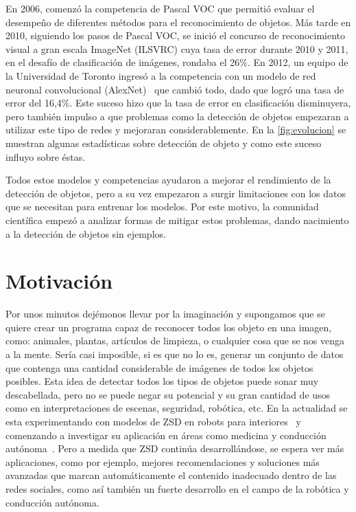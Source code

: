En 2006, comenzó la competencia de Pascal VOC que permitió evaluar el desempeño de diferentes métodos para el reconocimiento de objetos. Más tarde en 2010, siguiendo los pasos de Pascal VOC, se inició el concurso de reconocimiento visual a gran escala ImageNet (ILSVRC) cuya tasa de error durante 2010 y 2011, en el desafío de clasificación de imágenes, rondaba el 26\%.  En 2012, un equipo de la Universidad de Toronto ingresó a la competencia con un modelo de red neuronal convolucional (AlexNet)~\cite{krizhevsky2012imagenet} que cambió todo, dado que logró una tasa de error del 16,4\%. Este suceso hizo que la tasa de error en clasificación disminuyera, pero también impulso a que problemas como la detección de objetos empezaran a utilizar este tipo de redes y mejoraran considerablemente. En la \autoref{fig:evolucion} se muestran algunas estadísticas sobre detección de objeto y como este suceso influyo sobre éstas.

Todos estos modelos y competencias ayudaron a mejorar el rendimiento de la detección de objetos, pero a su vez empezaron a surgir limitaciones con los datos que se necesitan para entrenar los modelos. Por este motivo, la comunidad científica empezó a analizar formas de mitigar estos problemas, dando nacimiento a la detección de objetos sin ejemplos.


\section{Motivación} \label{sec:motivacion}

Por unos minutos dejémonos llevar por la imaginación y supongamos que se quiere crear un programa capaz de reconocer todos los objeto en una imagen, como: animales, plantas, artículos de limpieza, o cualquier cosa que se nos venga a la mente. Sería casi imposible, si es que no lo es, generar un conjunto de datos que contenga una cantidad considerable de imágenes de todos los objetos posibles. Esta idea de detectar todos los tipos de objetos puede sonar muy descabellada, pero no se puede negar su potencial y su gran cantidad de usos como en interpretaciones de escenas, seguridad, robótica, etc. En la actualidad se esta experimentando con modelos de ZSD en robots para interiores~\cite{abdalwhab2019zero} y comenzando a investigar su aplicación en áreas como medicina y conducción autónoma~\cite{rezaei2020zero}. Pero a medida que ZSD continúa desarrollándose, se espera ver más aplicaciones, como por ejemplo, mejores recomendaciones y soluciones más avanzadas que marcan automáticamente el contenido inadecuado dentro de las redes sociales, como así también un fuerte desarrollo en el campo de la robótica y conducción autónoma.


